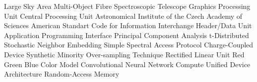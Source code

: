   {Large Sky Area Multi-Object Fibre Spectroscopic Telescope}
     {Graphics Processing Unit}
     {Central Processing Unit}
 {Astronomical Institute of the Czech Academy of Sciences}
   {American Standart Code for Information Interchange}
     {Header/Data Unit}
     {Application Programming Interface}
     {Principal Component Analysis}
   {t-Distributed Stochastic Neighbor Embedding}
    {Simple Spectral Access Protocol}
     {Charge-Coupled Device}
   {Synthetic Minority Over-sampling Technique}
    {Rectified Linear Unit}
     {Red Green Blue Color Model}
     {Convolutional Neural Network}
    {Compute Unified Device Architecture}
     {Random-Access Memory}
